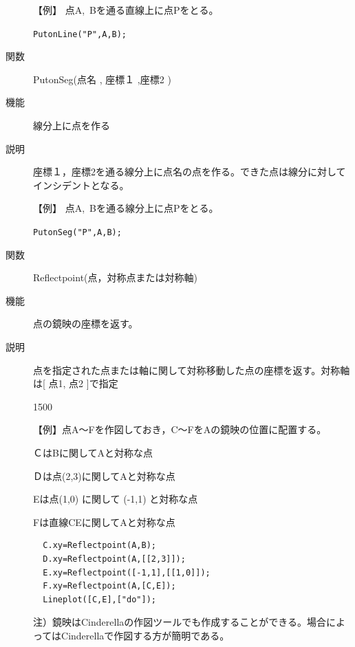 \documentclass[papersize,a4paper,12pt,uplatex]{jsarticle}
\begin{document}
\begin{description}
\vspace{\baselineskip}
【例】  点A,\ Bを通る直線上に点Pをとる。

  \verb|PutonLine("P",A,B);|

\vspace{\baselineskip}
\hypertarget{putonseg}{}
\item[関数]  PutonSeg(点名 , 座標１ ,座標2 )
\item[機能]  線分上に点を作る
\item[説明]  座標１，座標2を通る線分上に点名の点を作る。できた点は線分に対してインシデントとなる。

\vspace{\baselineskip}
【例】  点A,\ Bを通る線分上に点Pをとる。

    \verb|PutonSeg("P",A,B);|

\vspace{\baselineskip}
\hypertarget{reflectpoint}{}
\item[関数]  Reflectpoint(点，対称点または対称軸)
\item[機能]  点の鏡映の座標を返す。
\item[説明]  点を指定された点または軸に関して対称移動した点の座標を返す。対称軸は[ 点1, 点2 ]で指定

\vspace{\baselineskip}
\begin{layer}{150}{0}
\end{layer}

【例】点A〜Fを作図しておき，C〜FをAの鏡映の位置に配置する。

\hspace{5mm} ＣはBに関してAと対称な点

\hspace{5mm} Ｄは点(2,3)に関してAと対称な点

\hspace{5mm} Eは点(1,0) に関して (-1,1) と対称な点

\hspace{5mm} Fは直線CEに関してAと対称な点

\begin{verbatim}
  C.xy=Reflectpoint(A,B);
  D.xy=Reflectpoint(A,[[2,3]]);
  E.xy=Reflectpoint([-1,1],[[1,0]]);
  F.xy=Reflectpoint(A,[C,E]);
  Lineplot([C,E],["do"]);
\end{verbatim}

\vspace{\baselineskip}
注）鏡映はCinderellaの作図ツールでも作成することができる。場合によってはCinderellaで作図する方が簡明である。


\end{description}
\end{document}
